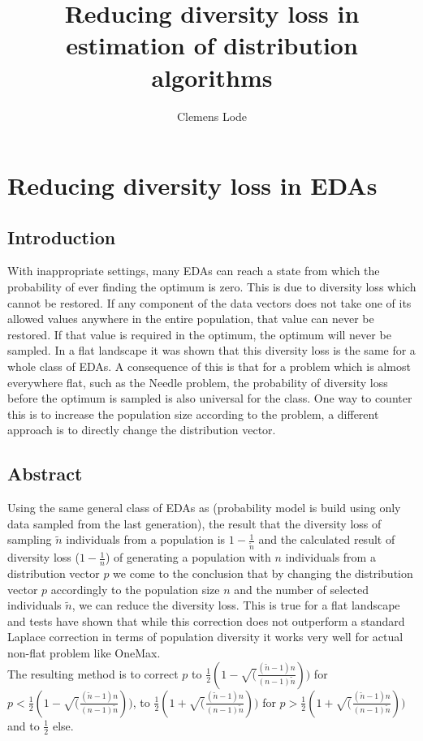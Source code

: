 \documentclass[a4paper,twoside]{report}
\title{Reducing diversity loss in estimation of distribution algorithms}
\author{Clemens Lode}
\begin{document}
\setcounter{chapter}{0}
\chapter{Reducing diversity loss in EDAs}

\section{Introduction}

With inappropriate settings, many EDAs can reach a state from which the probability of ever finding the optimum is zero. This is due to diversity loss which cannot be restored. If any component of the data vectors does not take one of its allowed values anywhere in the entire population, that value can never be restored. If that value is required in the optimum, the optimum will never be sampled. In a flat landscape it was shown that this diversity loss is the same for a whole class of EDAs. A consequence of this is that for a problem which is almost everywhere flat, such as the Needle problem, the probability of diversity loss before the optimum is sampled is also universal for the class. One way to counter this is to increase the population size according to the problem, a different approach is to directly change the distribution vector.

\section{Abstract}

Using the same general class of EDAs as \cite{Shapiro} (probability model is build using only data sampled from the last generation), the result that the diversity loss of sampling \(\tilde{n}\) individuals from a population is \(1 - \frac{1}{\tilde{n}}\) and the calculated result of diversity loss (\(1 - \frac{1}{n}\)) of generating a population with \(n\) individuals from a distribution vector \(p\) we come to the conclusion that by changing the distribution vector \(p\) accordingly to the population size \(n\) and the number of selected individuals \(\tilde{n}\), we can reduce the diversity loss. This is true for a flat landscape and tests have shown that while this correction does not outperform a standard Laplace correction in terms of population diversity it works very well for actual non-flat problem like OneMax.\\
The resulting method is to correct \(p\) to \(\frac{1}{2}(1 - \sqrt(\frac{(\tilde{n}-1)n}{(n-1)\tilde{n}}))\) for \(p < \frac{1}{2}(1 - \sqrt(\frac{(\tilde{n}-1)n}{(n-1)\tilde{n}}))\), to \(\frac{1}{2}(1 + \sqrt(\frac{(\tilde{n}-1)n}{(n-1)\tilde{n}}))\) for \(p > \frac{1}{2}(1 + \sqrt(\frac{(\tilde{n}-1)n}{(n-1)\tilde{n}}))\) and to \(\frac{1}{2}\) else.\\
\end{document}

